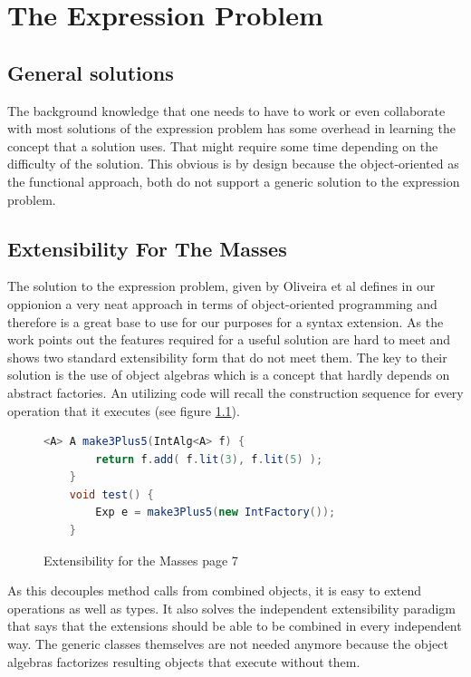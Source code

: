 \documentclass{report}
\begin{document}
\chapter{The Expression Problem}

\section{General solutions}

The background knowledge that one needs to have to work or even collaborate with most solutions of the expression problem has some overhead in learning the concept that a solution uses. That might require some time depending on the difficulty of the solution. This obvious is by design because the object-oriented as the functional approach, both do not support a generic solution to the expression problem.

\section{Extensibility For The Masses}

The solution to the expression problem, given by Oliveira et al \cite{Oliv-Extensibility-2012} defines in our oppionion a very neat approach in terms of object-oriented programming and therefore is a great base to use for our purposes for a syntax extension. As the work points out the features required \cite{Wadler-Expression-1998, Odersky-Expression-2005} for a useful solution are hard to meet and shows two standard extensibility form that do not meet them.
The key to their solution is the use of object algebras which is a concept that hardly depends on abstract factories. An utilizing code will recall the construction sequence for every operation that it executes (see figure \ref{make3Plus5}).

\begin{figure}[t]
\begin{lstlisting}[language=java]
    <A> A make3Plus5(IntAlg<A> f) {
        return f.add( f.lit(3), f.lit(5) );
    }
    void test() {
        Exp e = make3Plus5(new IntFactory());
    }
\end{lstlisting}
\caption{Extensibility for the Masses \cite{Oliv-Extensibility-2012} page 7}
\label{make3Plus5}
\end{figure}

As this decouples method calls from combined objects, it is easy to extend operations as well as types. It also solves the independent extensibility \cite{Odersky-Expression-2005} paradigm that says that the extensions should be able to be combined in every independent way. The generic classes themselves are not needed anymore because the object algebras factorizes resulting objects that execute without them.
\end{document}
